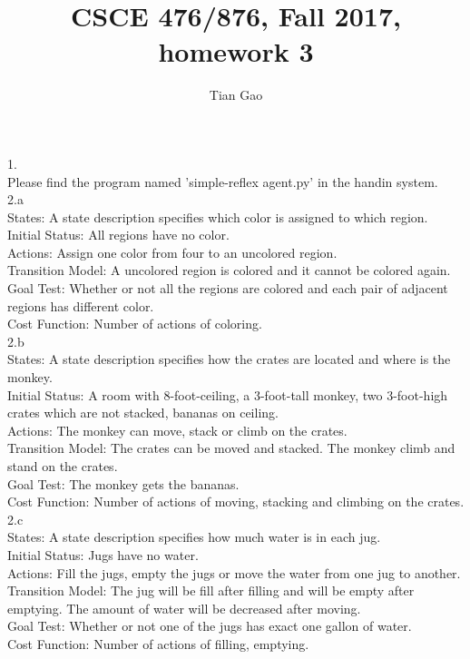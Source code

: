 \documentclass[a4paper]{article}
\title{CSCE 476/876, Fall 2017, homework 3}
\author{Tian Gao}
\begin{document}
\maketitle

1.\\
Please find the program named 'simple-reflex agent.py' in the handin system. \\

2.a \\
States: A state description specifies which color is assigned to which region.\\
Initial Status: All regions have no color.\\
Actions: Assign one color from four to an uncolored region.\\
Transition Model: A uncolored region is colored and it cannot be colored again.\\
Goal Test: Whether or not all the regions are colored and each pair of adjacent regions has different color.\\
Cost Function: Number of actions of coloring.\\

2.b \\
States: A state description specifies how the crates are located and where is the monkey.\\
Initial Status: A room with 8-foot-ceiling, a 3-foot-tall monkey, two 3-foot-high crates which are not stacked, bananas on ceiling.\\
Actions: The monkey can move, stack or climb on the crates.\\
Transition Model: The crates can be moved and stacked. The monkey climb and stand on the crates.\\
Goal Test: The monkey gets the bananas.\\
Cost Function: Number of actions of moving, stacking and climbing on the crates.\\

2.c \\
States: A state description specifies how much water is in each jug.\\
Initial Status: Jugs have no water.\\
Actions: Fill the jugs, empty the jugs or move the water from one jug to another.\\
Transition Model: The jug will be fill after filling and will be empty after emptying. The amount of water will be decreased after moving.\\
Goal Test: Whether or not one of the jugs has exact one gallon of water.\\
Cost Function: Number of actions of filling, emptying.\\
\end{document}

